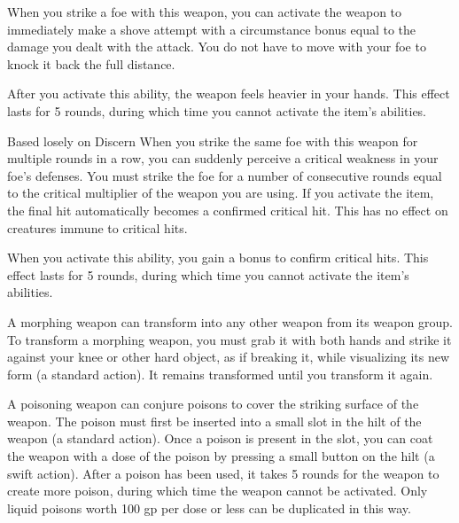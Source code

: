 
 When you strike a foe with this weapon, you can activate the weapon to immediately make a shove attempt with a circumstance bonus equal to the damage you dealt with the attack.
You do not have to move with your foe to knock it back the full distance.

After you activate this ability, the weapon feels heavier in your hands.
This effect lasts for 5 rounds, during which time you cannot activate the item's abilities.


Based losely on Discern
 When you strike the same foe with this weapon for multiple rounds in a row, you can suddenly perceive a critical weakness in your foe's defenses.
You must strike the foe for a number of consecutive rounds equal to the critical multiplier of the weapon you are using.
If you activate the item, the final hit automatically becomes a confirmed critical hit.
This has no effect on creatures immune to critical hits.

When you activate this ability, you gain a  bonus to confirm critical hits.
This effect lasts for 5 rounds, during which time you cannot activate the item's abilities.


 A morphing weapon can transform into any other weapon from its weapon group.
To transform a morphing weapon, you must grab it with both hands and strike it against your knee or other hard object, as if breaking it, while visualizing its new form (a standard action).
It remains transformed until you transform it again.


 A poisoning weapon can conjure poisons to cover the striking surface of the weapon.
The poison must first be inserted into a small slot in the hilt of the weapon (a standard action).
Once a poison is present in the slot, you can coat the weapon with a dose of the poison by pressing a small button on the hilt (a swift action).
After a poison has been used, it takes 5 rounds for the weapon to create more poison, during which time the weapon cannot be activated.
Only liquid poisons worth 100 gp per dose or less can be duplicated in this way.

